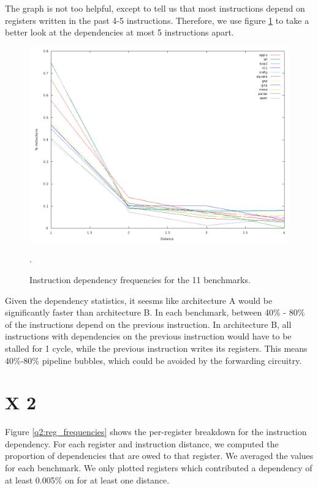 The graph is not too helpful, except to tell us that most instructions depend
on registers written in the past 4-5 instructions. Therefore, we use figure
\ref{q1:frequencies_zoom} to take a better look at the dependencies at most 5
instructions apart.

\begin{figure}[htb]
  \includegraphics[width=6.8in]{6.823/lab1/figs/frequencies_zoom.png}
  \caption{Instruction dependency frequencies for the 11 benchmarks. }
  \label{q1:frequencies_zoom}.
\end{figure}

Given the dependency statistics, it seesms like architecture A would be
significantly faster than architecture B. In each benchmark, between 40\% -
80\% of the instructions depend on the previous instruction. In architecture B,
all instructions with dependencies on the previous instruction would have to be
stalled for 1 cycle, while the previous instruction writes its registers. This
means 40\%-80\% pipeline bubbles, which could be avoided by the forwarding
circuitry.

\section{X 2}

Figure \ref{q2:reg_frequencies} shows the per-register breakdown for the
instruction dependency. For each register and instruction distance, we computed
the proportion of dependencies that are owed to that register. We averaged the
values for each benchmark. We only plotted registers which contributed a
dependency of at least 0.005\% on for at least one distance.

